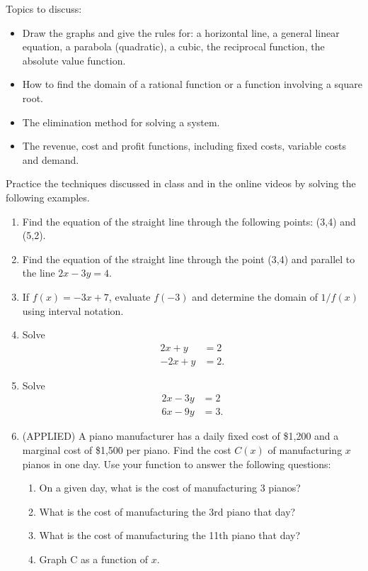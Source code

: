 \documentclass[10pt]{book}
\theoremstyle{definition}
\theoremstyle{remark}
\begin{document}
\begin{large}
\noindent
Topics to discuss:
\begin{itemize}
\item Draw the graphs and give the rules for: a horizontal line, a general linear equation, a parabola (quadratic), a cubic, the reciprocal function, the absolute value function.
\item How to find the domain of a rational function or a function involving a square root. 
\item The elimination method for solving a system. 
\item The revenue, cost and profit functions, including fixed costs, variable costs and demand. 
\end{itemize}
\newpage

\noindent
Practice the techniques discussed in class and in the online videos by solving the following examples. 
\begin{enumerate}
\item Find the equation of the straight line through the following points: (3,4) and (5,2). 
\vfil \vfil \vfil

\item Find the equation of the straight line through the point (3,4) and parallel to the line $2x-3y=4$.
\vfil \vfil \vfil

\item If $f(x) = -3x+7$, evaluate $f(-3)$ and determine the domain of $1/f(x)$ using interval notation. 
\vfil \vfil \vfil
\newpage

\item Solve \begin{align*}   2x + y &= 2\\ -2x + y &= 2. \end{align*}\vfil\vfil
\item Solve \begin{align*}   2x - 3y &= 2\\ 6x - 9y &= 3. \end{align*}\vfil
\newpage

\item (APPLIED) A piano manufacturer has a daily fixed cost of \$1,200 and a marginal cost of \$1,500 per piano. Find the cost $C(x)$ of
manufacturing $x$ pianos in one day. Use your function to answer the following questions:
	\begin{enumerate}
		\item  On a given day, what is the cost of manufacturing 3 pianos?
		\item  What is the cost of manufacturing the 3rd piano that day?
		\item  What is the cost of manufacturing the 11th piano that day?
		\item  Graph C as a function of $x$.
	\end{enumerate}\vfil \vfil



\end{enumerate}
\end{large}
\end{document}
